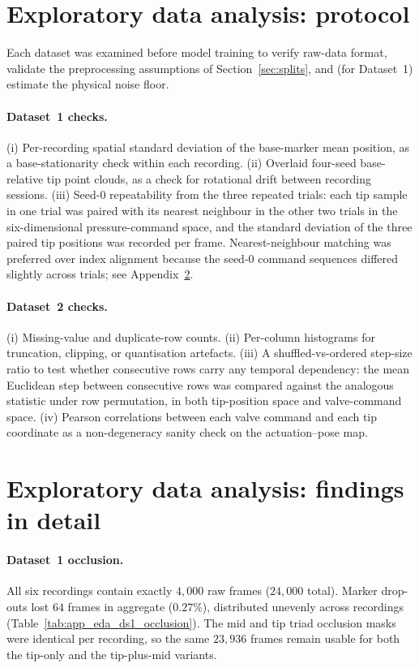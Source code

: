 \section{Exploratory data analysis: protocol}
\label{app:eda_protocol}

Each dataset was examined before model training to verify raw-data format, validate the preprocessing assumptions of Section~\ref{sec:splits}, and (for Dataset~1) estimate the physical noise floor.

\paragraph{Dataset~1 checks.}
(i) Per-recording spatial standard deviation of the base-marker mean position, as a base-stationarity check within each recording. (ii) Overlaid four-seed base-relative tip point clouds, as a check for rotational drift between recording sessions. (iii) Seed-0 repeatability from the three repeated trials: each tip sample in one trial was paired with its nearest neighbour in the other two trials in the six-dimensional pressure-command space, and the standard deviation of the three paired tip positions was recorded per frame. Nearest-neighbour matching was preferred over index alignment because the seed-0 command sequences differed slightly across trials; see Appendix~\ref{app:eda_detail}.

\paragraph{Dataset~2 checks.}
(i) Missing-value and duplicate-row counts. (ii) Per-column histograms for truncation, clipping, or quantisation artefacts. (iii) A shuffled-vs-ordered step-size ratio to test whether consecutive rows carry any temporal dependency: the mean Euclidean step between consecutive rows was compared against the analogous statistic under row permutation, in both tip-position space and valve-command space. (iv) Pearson correlations between each valve command and each tip coordinate as a non-degeneracy sanity check on the actuation--pose map.

\section{Exploratory data analysis: findings in detail}
\label{app:eda_detail}

\paragraph{Dataset~1 occlusion.}
All six recordings contain exactly $4{,}000$ raw frames ($24{,}000$ total). Marker drop-outs lost $64$ frames in aggregate ($0.27\%$), distributed unevenly across recordings (Table~\ref{tab:app_eda_ds1_occlusion}). The mid and tip triad occlusion masks were identical per recording, so the same $23{,}936$ frames remain usable for both the tip-only and the tip-plus-mid variants.

